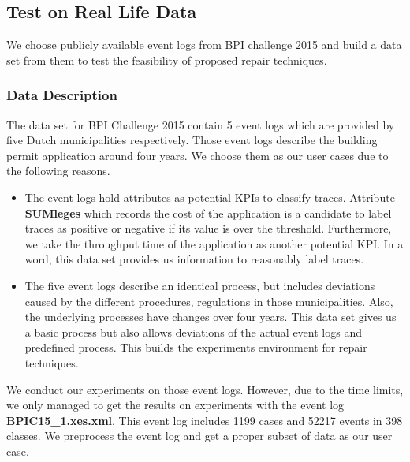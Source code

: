 \subsection{Test on Real Life Data}
We choose publicly available event logs from BPI challenge 2015 and build a data set from them to test the feasibility of proposed repair techniques.
\subsubsection{Data Description}
The data set for BPI Challenge 2015 contain 5 event logs which are provided by five Dutch municipalities respectively. Those event logs describe the building permit application around four years. We choose them as our user cases due to the following reasons.
\begin{itemize}
	\item The event logs hold attributes as potential KPIs to classify traces. Attribute \textbf{SUMleges} which records the cost of the application is a candidate to label traces as positive or negative if its value  is over the threshold. Furthermore, we take the throughput time of the application as another potential KPI. 
	In a word, this data set provides us information to reasonably label traces.
	\item The five event logs describe an identical process, but includes deviations caused by the different procedures, regulations in those municipalities. Also, the underlying processes have changes over four years.
	This data set gives us a basic process but also allows deviations of the actual event logs and predefined process. This builds the experiments environment for repair techniques.
\end{itemize}
We conduct our experiments on those event logs. However, due to the time limits, we only managed to get the results on experiments with the event log \textbf{BPIC15\_1.xes.xml}. This event log includes 1199 cases and 52217 events in 398 classes. We preprocess the event log and get a proper subset of data as our user case.  
